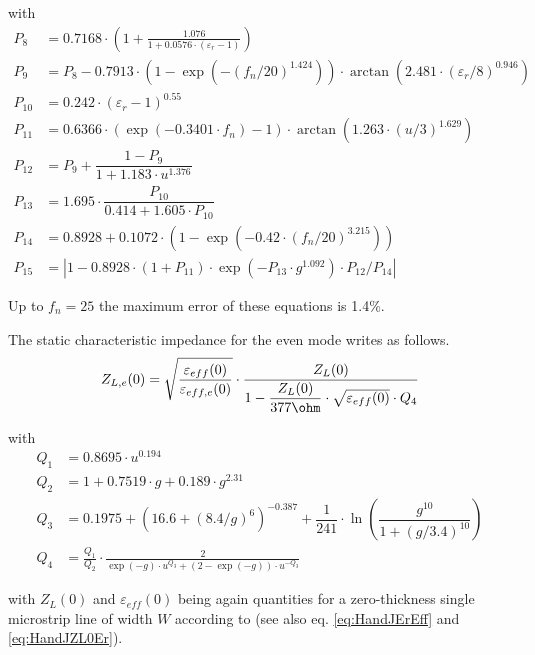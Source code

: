 \documentclass[10pt]{report}
\begin{document}
with
\begin{align}
P_8 &= 0.7168\cdot \left(1 + \frac{1.076}{1+0.0576\cdot \left(\varepsilon_r-1\right)} \right)\\
P_9 &= P_8 - 0.7913\cdot\left( 1-\exp\left( -\left( f_n/20\right) ^{1.424} \right) \right)
     \cdot\arctan\left( 2.481\cdot\left( \varepsilon_r/8\right) ^{0.946} \right)\\
P_{10} &= 0.242\cdot \left(\varepsilon_r-1\right)^{0.55}\\
P_{11} &= 0.6366\cdot \left(\exp\left(-0.3401\cdot f_n\right)-1\right) \cdot
      \arctan\left(1.263\cdot\left( u/3 \right) ^{1.629} \right)\\
P_{12} &= P_9 + \dfrac{1-P_9}{1+1.183\cdot u^{1.376}}\\
P_{13} &= 1.695\cdot \dfrac{P_{10}}{0.414+1.605\cdot P_{10}}\\
P_{14} &= 0.8928 + 0.1072\cdot \left( 1-\exp\left(-0.42\cdot\left(
        f_n/20 \right) ^{3.215} \right)\right)\\
P_{15} &= \left| 1 - 0.8928\cdot \left(1+P_{11}\right) \cdot \exp\left(-P_{13}\cdot g^{1.092}\right)\cdot
         P_{12}/P_{14} \right|
\end{align}

Up to $f_n=25$ the maximum error of these equations is 1.4\%.

\addvspace{12pt}

The static characteristic impedance for the even mode writes as follows.
\begin{equation}
Z_{L,e}(0) = \sqrt{\dfrac{\varepsilon_{eff}(0)}{\varepsilon_{eff,e}(0)}} \cdot
             \dfrac{Z_L(0)}{1 - \dfrac{Z_L(0)}{377\ohm} \cdot \sqrt{\varepsilon_{eff}(0)} \cdot Q_4}
\end{equation}

with
\begin{align}
Q_1 &= 0.8695\cdot u^{0.194}\\
Q_2 &= 1 + 0.7519\cdot g + 0.189\cdot g^{2.31}\\
Q_3 &= 0.1975 + \left( 16.6 + \left( 8.4/g \right) ^6 \right) ^{-0.387}
     + \dfrac{1}{241} \cdot \ln\left( \dfrac{g^{10}}{1+\left( g/3.4\right) ^{10}} \right)\\
Q_4 &= \frac{Q_1}{Q_2}\cdot \frac{2}{ \exp\left(-g\right)\cdot u^{Q_3} + (2-\exp\left(-g\right))\cdot u^{-Q_3} }
\end{align}

with $Z_L(0)$ and $\varepsilon_{eff}(0)$ being again quantities for a
zero-thickness single microstrip line of width $W$ according to
\cite{Hammerstad} (see also eq. \eqref{eq:HandJErEff} and
\eqref{eq:HandJZL0Er}).
\end{document}

